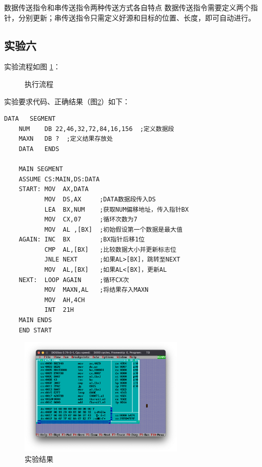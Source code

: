 \documentclass[11pt]{SEU-Digital-Report}
\begin{document}
\begin{note}{数据传送指令和串传送指令两种传送方式各自特点}{}
    数据传送指令需要定义两个指针，分别更新；串传送指令只需定义好源和目标的位置、长度，即可自动进行。
\end{note}

\subsection{实验六}
实验流程如图 \ref{fig:exp36}：
\begin{figure}[hbpt]
    \centering
    
    \caption{执行流程}
    \label{fig:exp36}
\end{figure}

实验要求代码、正确结果（图\ref{fig:rlt6}）如下：
\begin{lstlisting}[language={[x86masm]Assembler},title=exp36.asm]
    DATA   SEGMENT
    NUM    DB 22,46,32,72,84,16,156  ;定义数据段
    MAXN   DB ?  ;定义结果存放处
    DATA   ENDS

    MAIN SEGMENT 
    ASSUME CS:MAIN,DS:DATA
    START: MOV  AX,DATA
           MOV  DS,AX     ;DATA数据段传入DS
           LEA  BX,NUM    ;获取NUM偏移地址，传入指针BX
           MOV  CX,07     ;循环次数为7
           MOV  AL ,[BX]  ;初始假设第一个数据是最大值
    AGAIN: INC  BX        ;BX指针后移1位
           CMP  AL,[BX]   ;比较数据大小并更新标志位
           JNLE NEXT      ;如果AL>[BX]，跳转至NEXT
           MOV  AL,[BX]   ;如果AL<[BX]，更新AL
    NEXT:  LOOP AGAIN     ;循环CX次
           MOV  MAXN,AL   ;将结果存入MAXN
           MOV  AH,4CH
           INT  21H
    MAIN ENDS
    END START
\end{lstlisting}

\begin{figure}[htbp]
    \centering
    \includegraphics[width=0.7\textwidth]{fig/rlt6.png}
    \caption{实验结果}
    \label{fig:rlt6}
\end{figure}
\end{document}
